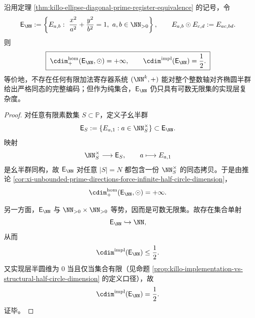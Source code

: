 \begin{theorem}\label{thm:xi-integer-ellipse-half-circle-dimension-gap}
沿用定理 \ref{thm:killo-ellipse-diagonal-prime-register-equivalence} 的记号，令
\[
\mathsf E_{\NN}
:=
\left\{
E_{a,b}:\ \frac{x^2}{a^2}+\frac{y^2}{b^2}=1,\ a,b\in\NN_{>0}
\right\},
\qquad
E_{a,b}\odot E_{c,d}:=E_{ac,bd}.
\]
则
\[
\boxed{\;
\cdim^{\mathrm{hom}}_{+}(\mathsf E_{\NN},\odot)=+\infty,
\qquad
\cdim^{\mathrm{impl}}(\mathsf E_{\NN})=\frac12.\;}
\]
等价地，不存在任何有限加法寄存器系统 \((\NN^k,+)\) 能对整个整数轴对齐椭圆半群给出严格同态的完整编码；但作为纯集合，\(\mathsf E_{\NN}\) 仍只具有可数无限集的实现层复杂度。
\end{theorem}
\begin{proof}
对任意有限素数集 \(S\subset\mathbb P\)，定义子幺半群
\[
\mathsf E_S:=\{E_{a,1}:a\in \NN_S^\times\}\subset \mathsf E_{\NN}.
\]
映射
\[
\NN_S^\times\longrightarrow \mathsf E_S,\qquad a\longmapsto E_{a,1}
\]
是幺半群同构，故 \(\mathsf E_{\NN}\) 对任意 \(|S|=N\) 都包含一份 \(\NN_S^\times\) 的同态拷贝。于是由推论 \ref{cor:xi-unbounded-prime-directions-force-infinite-half-circle-dimension}，
\[
\cdim^{\mathrm{hom}}_{+}(\mathsf E_{\NN},\odot)=+\infty.
\]

另一方面，\(\mathsf E_{\NN}\) 与 \(\NN_{>0}\times \NN_{>0}\) 等势，因而是可数无限集。故存在集合单射
\[
\mathsf E_{\NN}\hookrightarrow \NN,
\]
从而
\[
\cdim^{\mathrm{impl}}(\mathsf E_{\NN})\le \frac12.
\]
又实现层半圆维为 \(0\) 当且仅当集合有限（见命题 \ref{prop:killo-implementation-vs-structural-half-circle-dimension} 的定义口径），故
\[
\cdim^{\mathrm{impl}}(\mathsf E_{\NN})=\frac12.
\]
证毕。
\end{proof}

